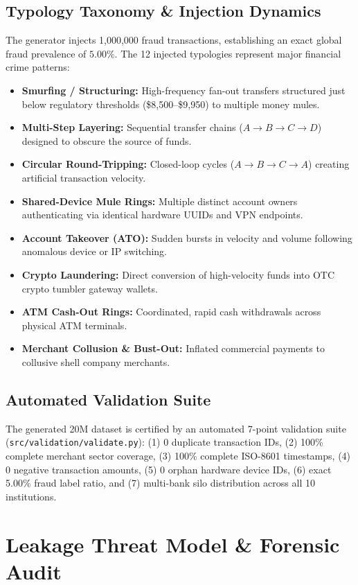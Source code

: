 \documentclass[conference]{IEEEtran}
\begin{document}
\subsection{Typology Taxonomy \& Injection Dynamics}
The generator injects 1,000,000 fraud transactions, establishing an exact global fraud prevalence of $5.00\%$. The 12 injected typologies represent major financial crime patterns:
\begin{itemize}
    \item \textbf{Smurfing / Structuring:} High-frequency fan-out transfers structured just below regulatory thresholds (\$8,500--\$9,950) to multiple money mules.
    \item \textbf{Multi-Step Layering:} Sequential transfer chains ($A \to B \to C \to D$) designed to obscure the source of funds.
    \item \textbf{Circular Round-Tripping:} Closed-loop cycles ($A \to B \to C \to A$) creating artificial transaction velocity.
    \item \textbf{Shared-Device Mule Rings:} Multiple distinct account owners authenticating via identical hardware UUIDs and VPN endpoints.
    \item \textbf{Account Takeover (ATO):} Sudden bursts in velocity and volume following anomalous device or IP switching.
    \item \textbf{Crypto Laundering:} Direct conversion of high-velocity funds into OTC crypto tumbler gateway wallets.
    \item \textbf{ATM Cash-Out Rings:} Coordinated, rapid cash withdrawals across physical ATM terminals.
    \item \textbf{Merchant Collusion \& Bust-Out:} Inflated commercial payments to collusive shell company merchants.
\end{itemize}

\subsection{Automated Validation Suite}
The generated 20M dataset is certified by an automated 7-point validation suite (\texttt{src/validation/validate.py}): (1) 0 duplicate transaction IDs, (2) 100\% complete merchant sector coverage, (3) 100\% complete ISO-8601 timestamps, (4) 0 negative transaction amounts, (5) 0 orphan hardware device IDs, (6) exact 5.00\% fraud label ratio, and (7) multi-bank silo distribution across all 10 institutions.

\section{Leakage Threat Model \& Forensic Audit}
\label{sec:leakage}
\end{document}
